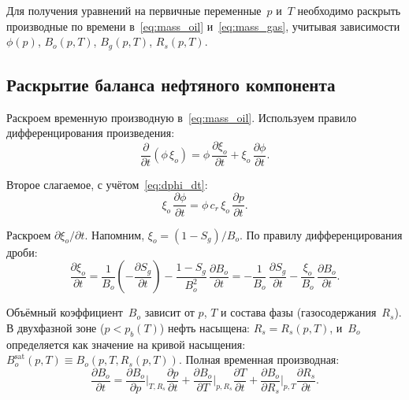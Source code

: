 \documentclass[12pt,a4paper]{article}
\begin{document}
Для получения уравнений на первичные переменные~$p$ и~$T$ необходимо
раскрыть производные по времени в~\eqref{eq:mass_oil}
и~\eqref{eq:mass_gas}, учитывая зависимости $\phi(p)$, $B_o(p,T)$,
$B_g(p,T)$, $R_s(p,T)$.

\subsection{Раскрытие баланса нефтяного компонента}\label{ssec:oil_expand}

Раскроем временную производную в~\eqref{eq:mass_oil}. Используем
правило дифференцирования произведения:
\begin{equation}\label{eq:oil_dt_step1}
  \frac{\partial}{\partial t}\!\left(\phi\,\xi_o\right)
  = \phi\,\frac{\partial\xi_o}{\partial t}
    + \xi_o\,\frac{\partial\phi}{\partial t}.
\end{equation}

Второе слагаемое, с учётом~\eqref{eq:dphi_dt}:
\begin{equation}\label{eq:oil_dt_phi}
  \xi_o\,\frac{\partial\phi}{\partial t}
  = \phi\,c_r\,\xi_o\,\frac{\partial p}{\partial t}.
\end{equation}

Раскроем $\partial\xi_o/\partial t$. Напомним, $\xi_o = (1 - S_g)/B_o$.
По правилу дифференцирования дроби:
\begin{equation}\label{eq:dxi_dt}
  \frac{\partial\xi_o}{\partial t}
  = \frac{1}{B_o}\!\left(-\frac{\partial S_g}{\partial t}\right)
    - \frac{1 - S_g}{B_o^2}\,\frac{\partial B_o}{\partial t}
  = -\frac{1}{B_o}\,\frac{\partial S_g}{\partial t}
    - \frac{\xi_o}{B_o}\,\frac{\partial B_o}{\partial t}.
\end{equation}

Объёмный коэффициент~$B_o$ зависит от $p$, $T$ и состава фазы
(газосодержания~$R_s$). В двухфазной зоне ($p < p_b(T)$) нефть
насыщена: $R_s = R_s(p,T)$, и~$B_o$ определяется как значение на
кривой насыщения: $B_o^{\mathrm{sat}}(p,T) \equiv B_o(p, T, R_s(p,T))$.
Полная временная производная:
\begin{equation}\label{eq:dBo_dt}
  \frac{\partial B_o}{\partial t}
  = \frac{\partial B_o}{\partial p}\bigg|_{T,R_s}\frac{\partial p}{\partial t}
    + \frac{\partial B_o}{\partial T}\bigg|_{p,R_s}\frac{\partial T}{\partial t}
    + \frac{\partial B_o}{\partial R_s}\bigg|_{p,T}
      \frac{\partial R_s}{\partial t}.
\end{equation}
\end{document}
